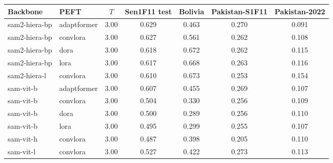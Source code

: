 \begin{tabular}{llccccc}
\toprule
Backbone & PEFT & $T$ & Sen1F11 test & Bolivia & Pakistan-S1F11 & Pakistan-2022 \\
\midrule
sam2-hiera-bp & adaptformer & 3.00 & 0.629 & 0.463 & 0.270 & 0.091 \\
sam2-hiera-bp & convlora & 3.00 & 0.627 & 0.561 & 0.262 & 0.108 \\
sam2-hiera-bp & dora & 3.00 & 0.618 & 0.672 & 0.262 & 0.115 \\
sam2-hiera-bp & lora & 3.00 & 0.617 & 0.668 & 0.263 & 0.116 \\
sam2-hiera-l & convlora & 3.00 & 0.610 & 0.673 & 0.253 & 0.154 \\
sam-vit-b & adaptformer & 3.00 & 0.607 & 0.455 & 0.269 & 0.107 \\
sam-vit-b & convlora & 3.00 & 0.504 & 0.330 & 0.256 & 0.109 \\
sam-vit-b & dora & 3.00 & 0.500 & 0.289 & 0.256 & 0.110 \\
sam-vit-b & lora & 3.00 & 0.495 & 0.299 & 0.255 & 0.107 \\
sam-vit-h & convlora & 3.00 & 0.487 & 0.398 & 0.205 & 0.110 \\
sam-vit-l & convlora & 3.00 & 0.527 & 0.422 & 0.273 & 0.113 \\
\bottomrule
\end{tabular}
